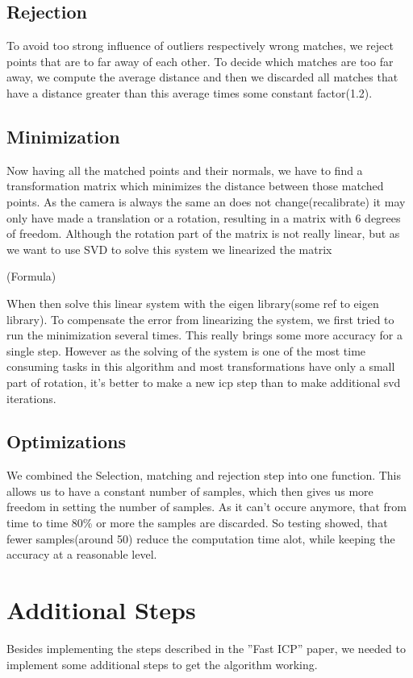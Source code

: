 \documentclass[10pt,twocolumn,letterpaper]{article}
\begin{document}
\subsection{Rejection}
To avoid too strong influence of outliers respectively wrong matches, we reject points that are to far away of each other. 
To decide which matches are too far away, we compute the average distance and then we discarded all matches that have a distance greater than this average times some constant factor(1.2).

\subsection{Minimization}
\label{minimization}
Now having all the matched points and their normals, we have to find a transformation matrix which minimizes the distance between those matched points.
As the camera is always the same an does not change(recalibrate) it may only have made a translation or a rotation, resulting in a matrix with 6 degrees of freedom.
Although the rotation part of the matrix is not really linear, but as we want to use SVD to solve this system we linearized the matrix

(Formula)

\cite{ptp}

When then solve this linear system with the eigen library(some ref to eigen library).
To compensate the error from linearizing the system, we first tried to run the minimization several times. 
This really brings some more accuracy for a single step. 
However as the solving of the system is one of the most time consuming tasks in this algorithm and most transformations have only a small part of rotation, it's better to make a new icp step than to make additional svd iterations.

\subsection{Optimizations}
We combined the Selection, matching and rejection step into one function. This allows us to have a constant number of samples, which then gives us more freedom in setting the number of samples.
As it can't occure anymore, that from time to time 80\% or more the samples are discarded. So testing showed, that fewer samples(around 50) reduce the computation time alot, while keeping the accuracy at a reasonable level.

\section{Additional Steps}
Besides implementing the steps described in the ''Fast ICP''\cite{fasticp} paper, we needed to implement some additional steps to get the algorithm working.
\end{document}
